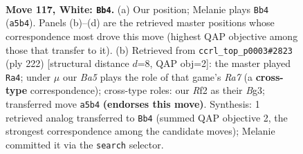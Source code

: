 \documentclass[11pt]{article}
\begin{document}
\clearpage

\begin{figure}[p]\centering
\begin{subfigure}{0.46\textwidth}\centering
\resizebox{\linewidth}{!}{%
\newchessgame
\chessboard[
  setfen={7k/8/7r/B7/8/8/K4R2/8 w - - 1 117},
  showmover=false,
  pgfstyle=straightmove, color=movearrow, markmove={a5-b4}
]}
\caption{}
\end{subfigure}\hfill
\begin{subfigure}{0.46\textwidth}\centering
\resizebox{\linewidth}{!}{%
\newchessgame
\chessboard[
  setfen={2r2k2/R7/4p3/8/8/3K2B1/8/8 w - - 19 112},
  showmover=false,
  pgfstyle=straightmove, color=movearrow, markmove={a7-a4}
]}
\caption{}
\end{subfigure}
\\[4pt]

\caption{\textbf{Move 117, White: \texttt{Bb4}.} (a) Our position; Melanie plays \texttt{Bb4} (\texttt{a5b4}). Panels (b)--(d) are the retrieved master positions whose correspondence most drove this move (highest QAP objective among those that transfer to it). (b) Retrieved from \texttt{ccrl\_top\_p0003\#2823} (ply 222) [structural distance $d$=8, QAP obj=2]: the master played \texttt{Ra4}; under $\mu$ our \emph{Ba5} plays the role of that game's \emph{Ra7} (a \textbf{cross-type} correspondence); cross-type roles: our \emph{R}f2 as their \emph{B}g3; transferred move \texttt{a5b4} \textbf{(endorses this move)}. Synthesis: 1 retrieved analog transferred to \texttt{Bb4} (summed QAP objective 2, the strongest correspondence among the candidate moves); Melanie committed it via the \texttt{search} selector.}
\label{fig:thought-m232}
\end{figure}

\clearpage
\end{document}
